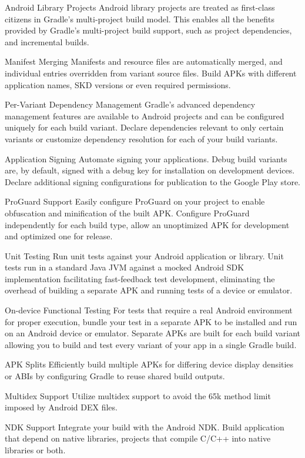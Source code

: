 Android Library Projects
Android library projects are treated as first-class citizens in Gradle's multi-project build model. This enables all the benefits provided by Gradle's multi-project build support, such as project dependencies, and incremental builds.

Manifest Merging
Manifests and resource files are automatically merged, and individual entries overridden from variant source files. Build APKs with different application names, SKD versions or even required permissions.

Per-Variant Dependency Management
Gradle's advanced dependency management features are available to Android projects and can be configured uniquely for each build variant. Declare dependencies relevant to only certain variants or customize dependency resolution for each of your build variants.

Application Signing
Automate signing your applications. Debug build variants are, by default, signed with a debug key for installation on development devices. Declare additional signing configurations for publication to the Google Play store.

ProGuard Support
Easily configure ProGuard on your project to enable obfuscation and minification of the built APK. Configure ProGuard independently for each build type, allow an unoptimized APK for development and optimized one for release.

Unit Testing
Run unit tests against your Android application or library. Unit tests run in a standard Java JVM against a mocked Android SDK implementation facilitating fast-feedback test development, eliminating the overhead of building a separate APK and running tests of a device or emulator.

On-device Functional Testing
For tests that require a real Android environment for proper execution, bundle your test in a separate APK to be installed and run on an Android device or emulator. Separate APKs are built for each build variant allowing you to build and test every variant of your app in a single Gradle build.

APK Splits
Efficiently build multiple APKs for differing device display densities or ABIs by configuring Gradle to reuse shared build outputs.

Multidex Support
Utilize multidex support to avoid the 65k method limit imposed by Android DEX files.

NDK Support
Integrate your build with the Android NDK. Build application that depend on native libraries, projects that compile C/C++ into native libraries or both.

